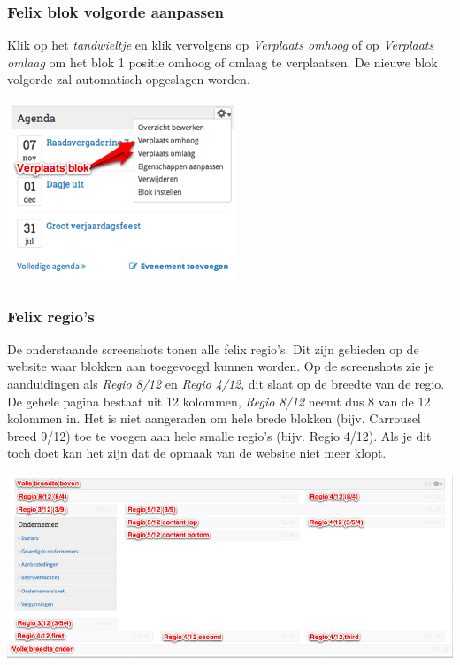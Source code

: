 \subsubsection{Felix blok volgorde aanpassen}\label{felixblokvolgorde}

Klik op het \emph{tandwieltje} en klik vervolgens op \emph{Verplaats omhoog} of op \emph{Verplaats omlaag} om het blok 1 positie omhoog of omlaag te verplaatsen. De nieuwe blok volgorde zal automatisch opgeslagen worden.

\begin{center}
	\includegraphics[scale=1.0]{img/felix3.png}
\end{center}

\subsubsection{Felix regio's}\label{felixregios}

De onderstaande screenshots tonen alle felix regio's. Dit zijn gebieden op de website waar blokken aan toegevoegd kunnen worden. Op de screenshots zie je aanduidingen als \emph{Regio 8/12} en \emph{Regio 4/12}, dit slaat op de breedte van de regio. De gehele pagina bestaat uit 12 kolommen, \emph{Regio 8/12} neemt dus 8 van de 12 kolommen in. Het is niet aangeraden om hele brede blokken (bijv. Carrousel breed 9/12) toe te voegen aan hele smalle regio's (bijv. Regio 4/12). Als je dit toch doet kan het zijn dat de opmaak van de website niet meer klopt.

\begin{center}
	\includegraphics[width=\textwidth]{img/felix1.png}
\end{center}

